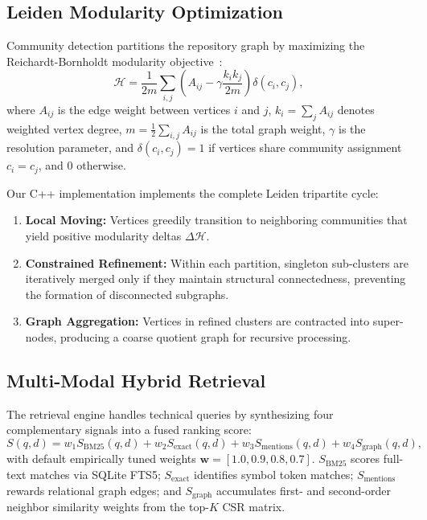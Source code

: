 \documentclass[conference]{IEEEtran}
\begin{document}
\subsection{Leiden Modularity Optimization}
Community detection partitions the repository graph by maximizing the Reichardt-Bornholdt modularity objective~\cite{traag2019leiden}:
\begin{equation}
\label{eq:modularity}
\mathcal{H} = \frac{1}{2m} \sum_{i,j} \left( A_{ij} - \gamma \frac{k_i k_j}{2m} \right) \delta(c_i, c_j),
\end{equation}
where $A_{ij}$ is the edge weight between vertices $i$ and $j$, $k_i = \sum_j A_{ij}$ denotes weighted vertex degree, $m = \frac{1}{2}\sum_{i,j} A_{ij}$ is the total graph weight, $\gamma$ is the resolution parameter, and $\delta(c_i, c_j) = 1$ if vertices share community assignment $c_i = c_j$, and 0 otherwise.

Our C++ implementation implements the complete Leiden tripartite cycle:
\begin{enumerate}
    \item \textbf{Local Moving:} Vertices greedily transition to neighboring communities that yield positive modularity deltas $\Delta \mathcal{H}$.
    \item \textbf{Constrained Refinement:} Within each partition, singleton sub-clusters are iteratively merged only if they maintain structural connectedness, preventing the formation of disconnected subgraphs.
    \item \textbf{Graph Aggregation:} Vertices in refined clusters are contracted into super-nodes, producing a coarse quotient graph for recursive processing.
\end{enumerate}

\subsection{Multi-Modal Hybrid Retrieval}
The retrieval engine handles technical queries by synthesizing four complementary signals into a fused ranking score:
\begin{equation}
\label{eq:hybrid}
S(q, d) = w_1 S_{\mathrm{BM25}}(q, d) + w_2 S_{\mathrm{exact}}(q, d) + w_3 S_{\mathrm{mentions}}(q, d) + w_4 S_{\mathrm{graph}}(q, d),
\end{equation}
with default empirically tuned weights $\mathbf{w} = [1.0, 0.9, 0.8, 0.7]$. $S_{\mathrm{BM25}}$ scores full-text matches via SQLite FTS5; $S_{\mathrm{exact}}$ identifies symbol token matches; $S_{\mathrm{mentions}}$ rewards relational graph edges; and $S_{\mathrm{graph}}$ accumulates first- and second-order neighbor similarity weights from the top-$K$ CSR matrix.
\end{document}
